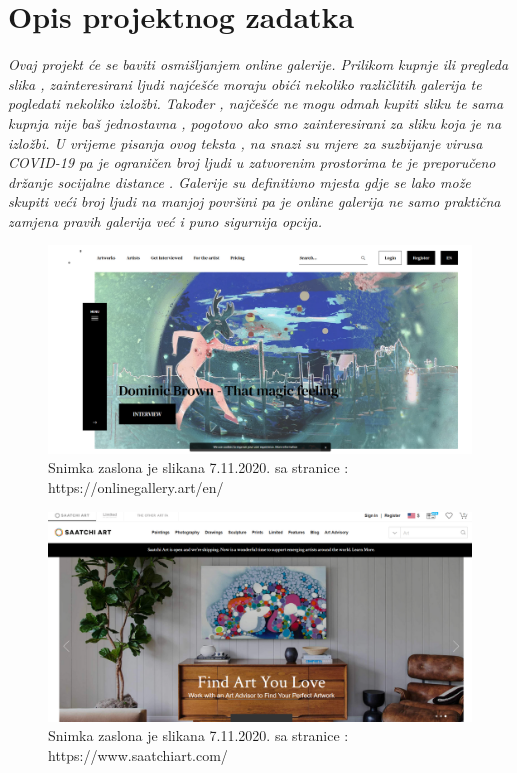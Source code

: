 \chapter{Opis projektnog zadatka}
		
		
		\textit{Ovaj projekt će se baviti osmišljanjem online galerije. Prilikom kupnje ili pregleda slika , zainteresirani ljudi najćešće moraju obići nekoliko različlitih galerija te pogledati nekoliko  izložbi. Također , najčešće ne mogu odmah kupiti sliku te sama kupnja nije baš jednostavna , pogotovo ako smo zainteresirani za sliku koja je na izložbi. 
			 U vrijeme pisanja ovog  teksta , na snazi su mjere za suzbijanje virusa COVID-19 pa je ograničen broj ljudi u zatvorenim prostorima te je preporučeno držanje socijalne distance . Galerije su definitivno  mjesta gdje se lako može skupiti  veći broj ljudi na manjoj površini pa je online galerija ne samo praktična zamjena pravih galerija  već i puno sigurnija opcija. 	
		\vspace{10mm} 
}
		\graphicspath{ {./slike/} }
				\begin{figure}[H]

					\includegraphics[width=\textwidth,height=\textheight,keepaspectratio]{onlinegallery_art}
					\caption{\newline Snimka zaslona je slikana 7.11.2020. sa  stranice : https://onlinegallery.art/en/ }

				\end{figure}
		\graphicspath{ {./slike/} }
				\begin{figure}[H]

					\includegraphics[width=\textwidth,height=\textheight,keepaspectratio]{saatchiart_com}
					\caption{\newline Snimka zaslona je slikana 7.11.2020. sa  stranice : https://www.saatchiart.com/}

				\end{figure}	
		
